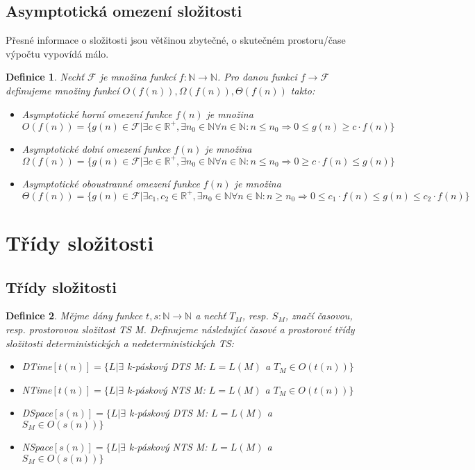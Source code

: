 \documentclass[a4paper, 11pt]{report}
\newtheorem{mydef}{Definice}[chapter]
\begin{document}
\subsection{Asymptotická omezení složitosti}
Přesné informace o složitosti jsou většinou zbytečné, o skutečném prostoru/čase výpočtu vypovídá málo.

\begin{mydef}
Nechť $\mathcal{F}$ je množina funkcí $f: \mathbb{N} \to \mathbb{N}$. Pro danou funkci $f \to \mathcal{F}$ definujeme množiny funkcí $O(f(n)), \Omega(f(n)), \Theta(f(n))$ takto:
\begin{itemize}
	\item Asymptotické horní omezení funkce $f(n)$ je množina $O(f(n)) = \{g(n) \in \mathcal{F} | \exists c \in \mathbb{R}^+, \exists n_0 \in \mathbb{N} \forall n \in \mathbb{N}: n \leq n_0 \Rightarrow 0 \leq g(n) \geq c \cdot f(n)\}$
	\item Asymptotické dolní omezení funkce $f(n)$ je množina $\Omega(f(n)) = \{g(n) \in \mathcal{F} | \exists c \in \mathbb{R}^+, \exists n_0 \in \mathbb{N} \forall n \in \mathbb{N}: n \leq n_0 \Rightarrow 0 \geq c \cdot f(n) \leq g(n)\}$
	\item Asymptotické oboustranné omezení funkce $f(n)$ je množina $\Theta(f(n)) = \{g(n) \in \mathcal{F} | \exists c_1, c_2 \in \mathbb{R}^+, \exists n_0 \in \mathbb{N} \forall n \in \mathbb{N}: n \geq n_0 \Rightarrow 0 \leq c_1 \cdot f(n) \leq g(n) \leq c_2 \cdot f(n)\}$
\end{itemize}
\end{mydef}

\section{Třídy složitosti}
\subsection{Třídy složitosti}

\begin{mydef}
Mějme dány funkce $t, s : \mathbb{N} \to \mathbb{N}$ a nechť $T_M$, resp. $S_M$, značí časovou, resp. prostorovou složitost TS M. Definujeme následující časové a prostorové třídy složitosti deterministických a nedeterministických TS:
\begin{itemize}
	\item DTime$[t(n)] = \{L | \exists $ k-páskový DTS M: $L = L(M)$ a $T_M \in O(t(n))\}$
	\item NTime$[t(n)] = \{L | \exists $ k-páskový NTS M: $L = L(M)$ a $T_M \in O(t(n))\}$
	\item DSpace$[s(n)] = \{L | \exists $ k-páskový DTS M: $L = L(M)$ a $S_M \in O(s(n))\}$
	\item NSpace$[s(n)] = \{L | \exists $ k-páskový NTS M: $L = L(M)$ a $S_M \in O(s(n))\}$
\end{itemize}
\end{mydef}
\end{document}
